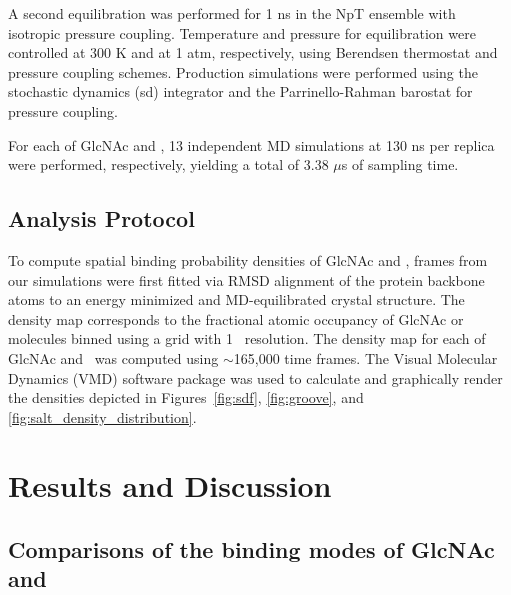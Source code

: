 A second equilibration was performed for 1 ns in the NpT ensemble with isotropic pressure coupling. Temperature and pressure for equilibration were controlled at 300 K and at 1 atm, respectively, using Berendsen thermostat and pressure coupling schemes. Production simulations were performed using the stochastic dynamics (sd) integrator and the Parrinello-Rahman barostat for pressure coupling.

For each of GlcNAc and \glucosamine, 13 independent MD simulations at 130 ns per replica were performed, respectively, yielding a total of 3.38 $\mu$s of sampling time.

\subsection*{Analysis Protocol}
To compute spatial binding probability densities of GlcNAc and \glucosamine, frames from our simulations were first fitted via RMSD alignment of the protein backbone atoms to an energy minimized and MD-equilibrated crystal structure. The density map corresponds to the fractional atomic occupancy of GlcNAc or \glucosamine molecules binned using a grid with 1 \angstrom\ resolution.  The density map for each of GlcNAc and \glucosamine\ was computed using $\sim$165,000 time frames. The Visual Molecular Dynamics (VMD) software package\cite{Humphrey:1996to} was used to calculate and graphically render the densities depicted in Figures~\ref{fig:sdf}, \ref{fig:groove}, and \ref{fig:salt_density_distribution}.

\section{Results and Discussion}


\subsection{Comparisons of the binding modes of GlcNAc and \glucosamine}

